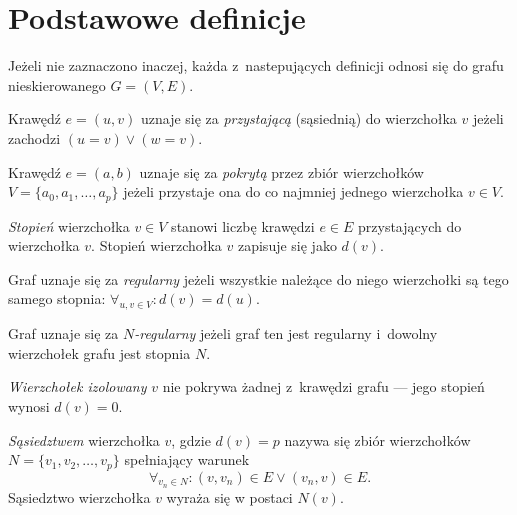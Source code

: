 \section{Podstawowe definicje}\label{s_definitions}

Jeżeli nie zaznaczono inaczej, każda z~nastepujących definicji odnosi się do
grafu nieskierowanego $G=(V,E)$.

\begin{definition}
  Krawędź $e=(u,v)$ uznaje się za \emph{przystającą} (sąsiednią) do wierzchołka $v$
  jeżeli zachodzi $(u=v) \lor (w=v)$.
\end{definition}

\begin{definition}
  Krawędź $e=(a,b)$ uznaje się za \emph{pokrytą} przez zbiór wierzchołków \\
  $V=\{a_0, a_1, \ldots, a_p\}$ jeżeli przystaje ona do co najmniej jednego
  wierzchołka $v \in V$.
\end{definition}

\begin{definition}
  \emph{Stopień} wierzchołka $v \in V$ stanowi liczbę krawędzi $e \in E$ przystających do wierzchołka $v$.
  Stopień wierzchołka $v$ zapisuje się jako $d(v)$.
\end{definition}

\begin{definition}
  Graf uznaje się za \emph{regularny} jeżeli wszystkie należące do niego wierzchołki są tego samego stopnia: $\forall_{u, v \in V}: {d(v)=d(u)}$.
\end{definition}

\begin{definition}
  Graf uznaje się za \emph{$N$-regularny} jeżeli graf ten jest regularny i~dowolny wierzchołek grafu jest stopnia $N$.
\end{definition}

\begin{definition}
  \emph{Wierzchołek izolowany} $v$ nie pokrywa żadnej z~krawędzi grafu --- jego stopień wynosi $d(v)=0$.
\end{definition}

\begin{definition}
  \emph{Sąsiedztwem} wierzchołka $v$, gdzie $d(v)=p$ nazywa się zbiór wierzchołków $N=\{v_1, v_2, \ldots, v_p\}$ spełniający warunek 
  \[\forall_{v_n \in N}:{(v,v_n) \in E \lor (v_n,v) \in E}.\]
  Sąsiedztwo wierzchołka $v$ wyraża się w postaci $N(v)$.
\end{definition}

